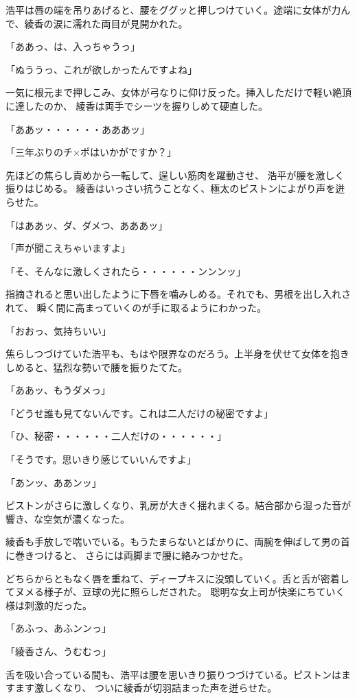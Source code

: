 ﻿\documentclass[book,tate]{jlreq}
\begin{document}
浩平は唇の端を吊りあげると、腰をググッと押しつけていく。途端に女体が力んで、綾香の涙に濡れた両目が見開かれた。

「ああっ、は、入っちゃうっ」

「ぬううっ、これが欲しかったんですよね」

一気に根元まで押しこみ、女体が弓なりに仰け反った。挿入しただけで軽い絶頂に達したのか、
綾香は両手でシーツを握りしめて硬直した。

「ああッ・・・・・・あああッ」

「三年ぶりのチ×ポはいかがですか？」

先ほどの焦らし責めから一転して、逞しい筋肉を躍動させ、 浩平が腰を激しく振りはじめる。
綾香はいっさい抗うことなく、極太のピストンによがり声を迸らせた。

「はああッ、ダ、ダメつ、あああッ」

「声が聞こえちゃいますよ」

「そ、そんなに激しくされたら・・・・・・ンンンッ」

指摘されると思い出したように下唇を噛みしめる。それでも、男根を出し入れされて、
瞬く間に高まっていくのが手に取るようにわかった。

「おおっ、気持ちいい」

焦らしつづけていた浩平も、もはや限界なのだろう。上半身を伏せて女体を抱きしめると、猛烈な勢いで腰を振りたてた。

「ああッ、もうダメっ」

「どうせ誰も見てないんです。これは二人だけの秘密ですよ」

「ひ、秘密・・・・・・二人だけの・・・・・・」

「そうです。思いきり感じていいんですよ」

「あンッ、ああンッ」

ピストンがさらに激しくなり、乳房が大きく揺れまくる。結合部から湿った音が響き、な空気が濃くなった。

綾香も手放しで喘いでいる。もうたまらないとばかりに、両腕を伸ばして男の首に巻きつけると、
さらには両脚まで腰に絡みつかせた。

どちらからともなく唇を重ねて、ディープキスに没頭していく。舌と舌が密着してヌメる様子が、豆球の光に照らしだされた。
聡明な女上司が快楽にちていく様は刺激的だった。

「あふっ、あふンンっ」

「綾香さん、うむむっ」

舌を吸い合っている間も、浩平は腰を思いきり振りつづけている。ピストンはますます激しくなり、
ついに綾香が切羽詰まった声を迸らせた。
\end{document}
